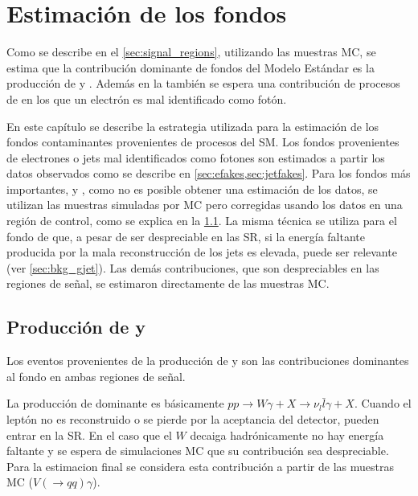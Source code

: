 \chapter{Estimación de los fondos} \label{cap:fondos}

Como se describe en el \cref{sec:signal_regions}, utilizando las
muestras MC, se estima que la contribución dominante de fondos del Modelo
Estándar es la producción de {\wgam} y {\ttgam}. Además en la {\SRL} también se
espera una contribución de procesos de {\ttbar} en los que un electrón es mal
identificado como fotón.

En este capítulo se describe la estrategia utilizada para la estimación de los
fondos contaminantes provenientes de procesos del SM.
Los fondos provenientes de electrones o jets mal identificados como fotones son
estimados a partir los datos observados como se describe en
\cref{sec:efakes,sec:jetfakes}. %
Para los fondos más importantes, {\wgam} y
{\ttgam}, como no es posible obtener una estimación de los datos, se
utilizan las muestras simuladas por MC pero corregidas usando los datos en
una región de control, como se explica en la \cref{sec:bkg_wgam_ttgam}. La
misma técnica se utiliza para el fondo de {\gjet} que, a pesar de ser
despreciable en las SR, si la energía faltante producida por la mala
reconstrucción de los jets es elevada, puede ser relevante (ver
\cref{sec:bkg_gjet}). Las demás contribuciones, que son despreciables en
las regiones de señal, se estimaron directamente de las muestras MC.



\section[Producción de {\wgam} y $tt\gamma$]{Producción de {\wgam} y {\ttgam}}
\label{sec:bkg_wgam_ttgam}

Los eventos provenientes de la producción de {\wgam} y {\ttgam} son las
contribuciones dominantes al fondo en ambas regiones de señal.

La producción de {\wgam} dominante es básicamente $pp \to W\gamma + X \to \nu_l
\bar{l}\gamma + X$. Cuando el leptón no es reconstruido o se pierde por la
aceptancia del detector, pueden entrar en la SR. En el caso que el $W$
decaiga hadrónicamente no hay energía faltante y se espera de simulaciones MC que
su contribución sea despreciable. Para la estimacion final se considera
esta contribución a partir de las muestras MC ($V(\to qq)\gamma$).

